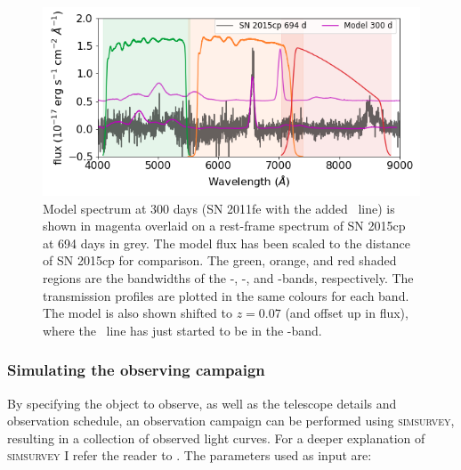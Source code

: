 \documentclass[a4paper,oneside,12pt, class=Latex/Classes/PhDthesisPSnPDF, crop=false]{standalone}
\begin{document}
\begin{figure}
 \centering
 \includegraphics[width=\textwidth]{../Images/chapter_3/Model_15cp_comparison.png}
 \caption[Spectral comparision between SN 2011fe + \Halpha~model and SN 2015cp.]{Model spectrum at 300 days (SN 2011fe with the added \Halpha~line) is shown in magenta overlaid on a rest-frame spectrum of SN 2015cp at 694 days in grey. The model flux has been scaled to the distance of SN 2015cp for comparison. The green, orange, and red shaded regions are the bandwidths of the \ztfg-, \ztfr-, and \ztfi-bands, respectively. The transmission profiles are plotted in the same colours for each band. The model is also shown shifted to $z = 0.07$ (and offset up in flux), where the \Halpha~line has just started to be in the \ztfi-band.}
 \label{mod_15cp_comp}
\end{figure}


\subsubsection{Simulating the observing campaign}
\label{sim_obs}
By specifying the object to observe, as well as the telescope details and observation schedule, an observation campaign can be performed using \textsc{simsurvey}, resulting in a collection of observed light curves. For a deeper explanation of \textsc{simsurvey} I refer the reader to \cite{simsurvey_main}. The parameters used as input are:
\end{document}
